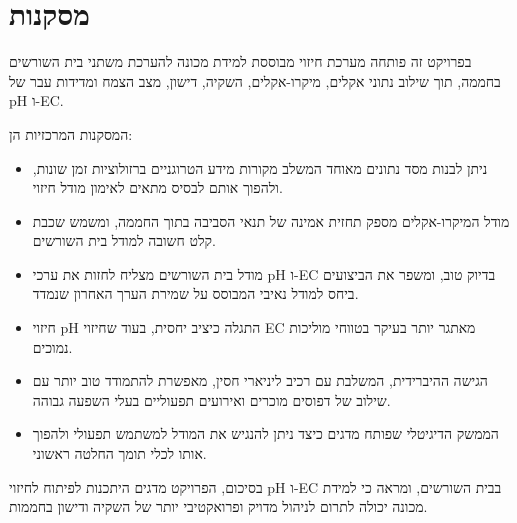 \section{מסקנות}
בפרויקט זה פותחה מערכת חיזוי מבוססת למידת מכונה להערכת משתני בית השורשים בחממה, תוך שילוב נתוני אקלים, מיקרו-אקלים, השקיה, דישון, מצב הצמח ומדידות עבר של pH ו-EC.

המסקנות המרכזיות הן:

\begin{itemize}
    \item ניתן לבנות מסד נתונים מאוחד המשלב מקורות מידע הטרוגניים ברזולוציות זמן שונות, ולהפוך אותם לבסיס מתאים לאימון מודל חיזוי.
    \item מודל המיקרו-אקלים מספק תחזית אמינה של תנאי הסביבה בתוך החממה, ומשמש שכבת קלט חשובה למודל בית השורשים.
    \item מודל בית השורשים מצליח לחזות את ערכי pH ו-EC בדיוק טוב, ומשפר את הביצועים ביחס למודל נאיבי המבוסס על שמירת הערך האחרון שנמדד.
    \item חיזוי pH התגלה כיציב יחסית, בעוד שחיזוי EC מאתגר יותר בעיקר בטווחי מוליכות נמוכים.
    \item הגישה ההיברידית, המשלבת \GB{} עם רכיב ליניארי חסין, מאפשרת להתמודד טוב יותר עם שילוב של דפוסים מוכרים ואירועים תפעוליים בעלי השפעה גבוהה.
    \item הממשק הדיגיטלי שפותח מדגים כיצד ניתן להנגיש את המודל למשתמש תפעולי ולהפוך אותו לכלי תומך החלטה ראשוני.
\end{itemize}

בסיכום, הפרויקט מדגים היתכנות לפיתוח \SoftSensor{} לחיזוי pH ו-EC בבית השורשים, ומראה כי למידת מכונה יכולה לתרום לניהול מדויק ופרואקטיבי יותר של השקיה ודישון בחממות.
